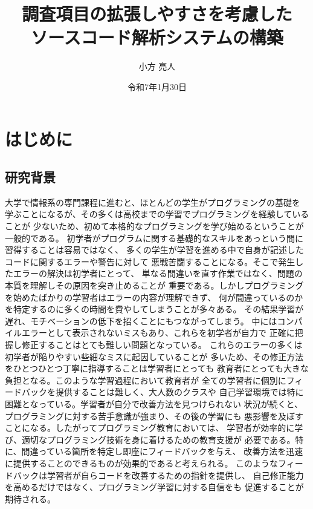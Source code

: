 \documentclass{cssspaper}
\title {調査項目の拡張しやすさを考慮した\\ソースコード解析システムの構築}
\author{小方 亮人}
\date{令和7年1月30日}
\begin{document}
\maketitle

    \chapter{はじめに}
        \section{研究背景}
        大学で情報系の専門課程に進むと、ほとんどの学生がプログラミングの基礎を
        学ぶことになるが、その多くは高校までの学習でプログラミングを経験していることが
        少ないため、初めて本格的なプログラミングを学び始めるということが一般的である。
        初学者がプログラムに関する基礎的なスキルをあっという間に習得することは容易ではなく、
        多くの学生が学習を進める中で自身が記述したコードに関するエラーや警告に対して
        悪戦苦闘することになる。そこで発生したエラーの解決は初学者にとって、
        単なる間違いを直す作業ではなく、問題の本質を理解しその原因を突き止めることが
        重要である。しかしプログラミングを始めたばかりの学習者はエラーの内容が理解できず、
        何が間違っているのかを特定するのに多くの時間を費やしてしまうことが多々ある。
        その結果学習が遅れ、モチベーションの低下を招くことにもつながってしまう。
        中にはコンパイルエラーとして表示されないミスもあり、これらを初学者が自力で
        正確に把握し修正することはとても難しい問題となっている。
        これらのエラーの多くは初学者が陥りやすい些細なミスに起因していることが
        多いため、その修正方法をひとつひとつ丁寧に指導することは学習者にとっても
        教育者にとっても大きな負担となる。このような学習過程において教育者が
        全ての学習者に個別にフィードバックを提供することは難しく、大人数のクラスや
        自己学習環境では特に困難となっている。学習者が自分で改善方法を見つけられない
        状況が続くと、プログラミングに対する苦手意識が強まり、その後の学習にも
        悪影響を及ぼすことになる。したがってプログラミング教育においては、
        学習者が効率的に学び、適切なプログラミング技術を身に着けるための教育支援が
        必要である。特に、間違っている箇所を特定し即座にフィードバックを与え、
        改善方法を迅速に提供することのできるものが効果的であると考えられる。
        このようなフィードバックは学習者が自らコードを改善するための指針を提供し、
        自己修正能力を高めるだけではなく、プログラミング学習に対する自信をも
        促進することが期待される。
\end{document}
